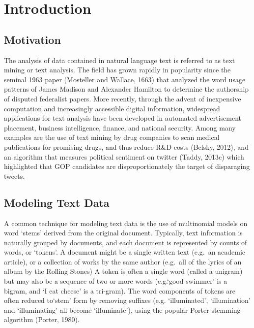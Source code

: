\documentclass[12pt]{article}
\begin{document}
\vspace{1.5in}
\tableofcontents


\newpage


\section{Introduction}

\subsection{Motivation}


The analysis of data contained in natural language text is referred to as text mining or text analysis. 
The field has grown rapidly in popularity since the seminal 1963 paper (Mosteller and Wallace, 1663) that analyzed the
word usage patterns of James Madison and Alexander Hamilton to determine the authorship of disputed federalist papers.
More recently, through the advent of inexpensive computation and increasingly accessible digital information, widespread applications for text analysis have been developed in automated advertisement placement, business intelligence, finance, and national security. Among many examples are the use of text mining by drug companies to scan medical publications for promising drugs, and thus reduce R\&D costs (Belsky, 2012), and  an algorithm that measures political sentiment on twitter (Taddy, 2013c) which highlighted that GOP candidates are disproportionately the target of disparaging tweets. 

\subsection{Modeling Text Data}


A common technique for modeling text data is the use of multinomial models on word `stems' derived from the original document.
Typically, text information is naturally grouped by documents, and each
document is represented by counts of words, or `tokens'. A document might be a
single written text (e.g.~an academic article), or a collection of works
by the same author (e.g.~all of the lyrics of an album by the Rolling
Stones) A token is often a single word (called a unigram) but may also be
a sequence of two or more words (e.g.`good swimmer' is a
bigram, and `I eat cheese' is a tri-gram). The word components of
tokens are often reduced to`stem' form by removing suffixes (e.g.
`illuminated', `illumination' and `illuminating' all become
`illuminate'), using the popular Porter stemming algorithm (Porter, 1980).
\end{document}
